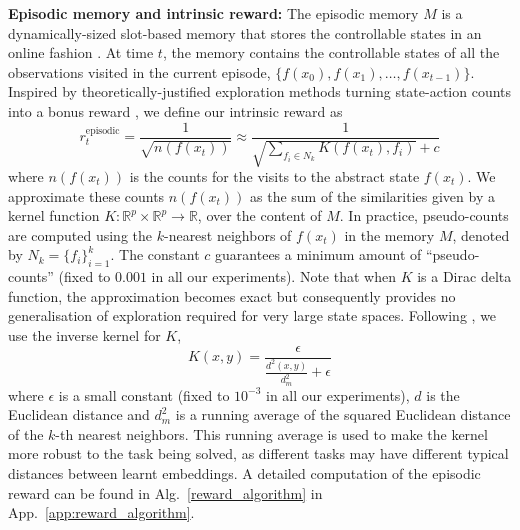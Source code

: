\documentclass{article} %
\begin{document}
{\bf Episodic memory and intrinsic reward:} The episodic memory $M$ is a dynamically-sized slot-based memory that stores the controllable states in an online fashion \citep{pritzel2017neural}. 
At time $t$, the memory contains the controllable states of all the observations visited in the current episode, $\{f(x_0), f(x_1), \ldots, f(x_{t-1})\}$.
Inspired by theoretically-justified exploration methods turning state-action counts into a bonus reward \citep{strehl2008analysis}, we define our intrinsic reward as
\begin{equation}
\label{eq:reward_computation}
r_t^{\text{episodic}} = \frac{1}{\sqrt{n(f(x_t))}}  \approx \frac{1}{\sqrt{\sum_{f_i\in N_k} K(f(x_t), f_i)} + c}
\end{equation}
where $n(f(x_t))$ is the counts for the visits to the abstract state $f(x_t)$. We approximate these counts $n(f(x_t))$ as the sum of the similarities given by a kernel function $K: \mathbb{R}^p \times \mathbb{R}^p \rightarrow \mathbb{R}$, over the content of $M$. In practice, pseudo-counts are computed using the $k$-nearest neighbors of $f(x_t)$ in the memory $M$, denoted by $N_k=\{f_i\}_{i=1}^k$. The constant $c$ guarantees a minimum amount of ``pseudo-counts'' (fixed to $0.001$ in all our experiments). Note that when $K$ is a Dirac delta function, the approximation becomes exact but consequently provides no generalisation of exploration required for very large state spaces. Following \citet{blundell2016model,pritzel2017neural}, we use the inverse kernel for $K$,
\begin{equation}
K(x, y) =  \frac{\epsilon}{\frac{d^2(x, y)}{d^2_m} + \epsilon}
\end{equation}
where $\epsilon$ is a small constant (fixed to $10^{-3}$ in all our experiments), $d$ is the Euclidean distance and $d^2_m$ is
a running average of the squared Euclidean distance of the $k$-th nearest neighbors. This running average is used to make the kernel more robust to the task being solved, as different tasks may have different typical distances between learnt embeddings. A detailed computation of the episodic reward can be found in Alg.~\ref{reward_algorithm} in App.~\ref{app:reward_algorithm}.
\end{document}
